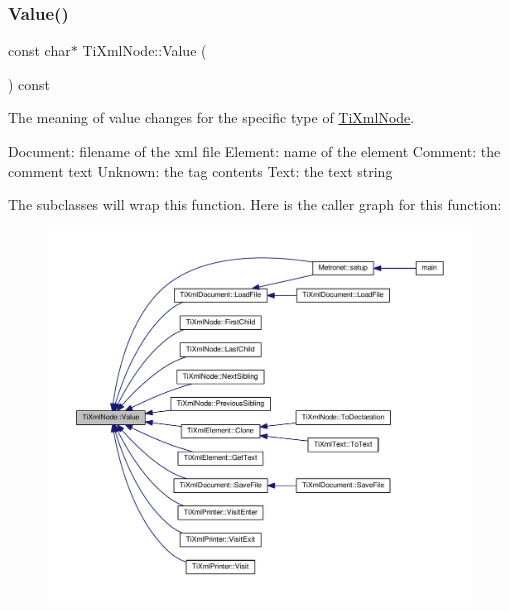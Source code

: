 \subsubsection{\texorpdfstring{Value()}{Value()}}
{\footnotesize\ttfamily const char$\ast$ Ti\+Xml\+Node\+::\+Value (\begin{DoxyParamCaption}{ }\end{DoxyParamCaption}) const\hspace{0.3cm}{\ttfamily [inline]}}

The meaning of \textquotesingle{}value\textquotesingle{} changes for the specific type of \hyperlink{class_ti_xml_node}{Ti\+Xml\+Node}. \begin{DoxyVerb}Document:   filename of the xml file
Element:    name of the element
Comment:    the comment text
Unknown:    the tag contents
Text:       the text string
\end{DoxyVerb}


The subclasses will wrap this function. Here is the caller graph for this function\+:\nopagebreak
\begin{figure}[H]
\begin{center}
\leavevmode
\includegraphics[width=350pt]{class_ti_xml_node_ad44dfe927d49a74dd78b72b7514417ad_icgraph}
\end{center}
\end{figure}
\mbox{\label{class_ti_xml_node_a74c4ea4a91c0a91900c919f69f657d6a}} 

